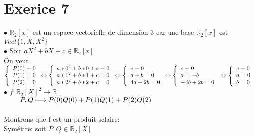 \documentclass{article}
\author{Frederic Becerril}
\newcommand\tab[1][1cm]{\hspace*{#1}}
\begin{document}
\part*{Exerice 7}

$\bullet$ $\mathbb{R}_2[x]$ est un espace vectorielle de dimension 3 car une base $\mathbb{R}_2[x]$ est $Vect\{1, X, X^2\}$\\
$\bullet$ Soit $aX^2 + bX + c \in \mathbb{R}_2[x]$\\
On veut $\left\{
    \begin{array}{ll}
        P(0) = 0\\
        P(1) = 0\\
        P(2) = 0\\
    \end{array}
\right. \Leftrightarrow \left\{
    \begin{array}{ll}
        a * 0^2 + b * 0 + c = 0\\
        a * 1^2 + b * 1 + c = 0\\
        a * 2^2 + b * 2 + c = 0\\
    \end{array}
\right. \Leftrightarrow \left\{
    \begin{array}{ll}
        c = 0\\
        a + b = 0\\
        4a + 2b = 0\\
    \end{array}
\right. \Leftrightarrow \left\{
    \begin{array}{ll}
        c = 0\\
        a = -b\\
        -4b + 2b = 0\\
    \end{array}
\right.\\ \Leftrightarrow \left\{
    \begin{array}{ll}
        c = 0\\
        a = 0\\
        b = 0\\
    \end{array}
\right.$\\
$\bullet$ $f: \mathbb{R}_2[X]^2 \rightarrow \mathbb{R}$\\
$\tab[0.8cm] P, Q \longmapsto P(0)Q(0) + P(1)Q(1) + P(2)Q(2)$\\
\\
Montrons que f est un produit sclaire:\\
Symétire: soit $P, Q \in \mathbb{R}_2[X]$\\
\end{document}
